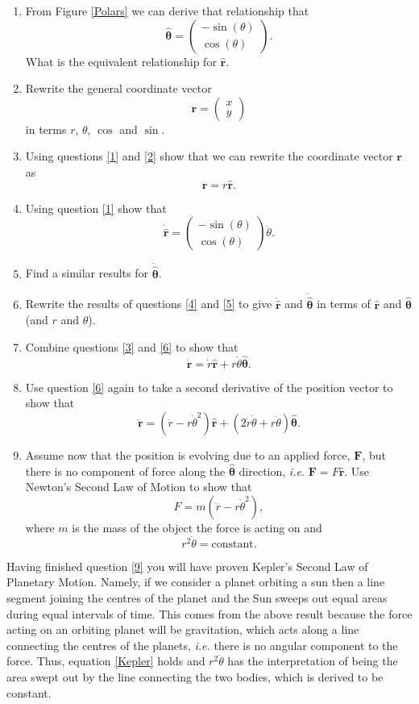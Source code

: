 \documentclass[]{article}
\newcommand{\myvec}[1]{\ensuremath{\begin{pmatrix}#1\end{pmatrix}}}
\newcommand{\bb}{\begin{equation}}
\newcommand{\ee}{\end{equation}}
\newcommand{\fig}[1]{Figure \ref{#1}}
\newcommand{\eqn}[1]{equation \eqref{#1}}
\newcommand{\ie}{\emph{i.e.} }
\renewcommand{\l}{\left(}
\renewcommand{\r}{\right)}
\begin{document}
\begin{enumerate}
\item \label{1} From \fig{Polars} we can derive that relationship that
\bb
\hat{\bm{\theta}}=\myvec{-\sin(\theta)\\ \cos(\theta)}.
\ee
What is the equivalent relationship for $\hat{\bm{r}}$.
\item \label{2} Rewrite the general coordinate vector
\bb
\bm{r}=\myvec{x\\y}
\ee
in terms $r$, $\theta$, $\cos$ and $\sin$.
\item \label{3} Using questions \ref{1} and \ref{2} show that we can rewrite the coordinate vector $\bm{r}$ as
\bb
\bm{r}=r\hat{\bm{r}}.
\ee
\item \label{4} Using question \ref{1} show that
\bb
\dot{\hat{\bm{r}}}=\myvec{-\sin(\theta)\\\cos(\theta)}\dot{\theta}.
\ee
\item \label{5} Find a similar results for $\dot{\hat{\bm{\theta}}}$.
\item \label{6} Rewrite the results of questions \ref{4} and \ref{5} to give $\dot{\hat{\bm{r}}}$ and $\dot{\hat{\bm{\theta}}}$ in terms of $\hat{\bm{r}}$ and $\hat{\bm{\theta}}$ (and $r$ and $\theta$).
\item \label{7} Combine questions \ref{3} and \ref{6} to show that
\bb
\dot{\bm{r}}=\dot{r}\hat{\bm{r}}+r\dot{\theta}\hat{\bm{\theta}}.
\ee
\item \label{8} Use question \ref{6} again to take a second derivative of the position vector to show that
\bb
\ddot{\bm{r}}=\l\ddot{r}-r\dot{\theta}^2\r\hat{\bm{r}}+\l 2\dot{r}\dot{\theta}+r\ddot{\theta}\r\hat{\bm{\theta}}.
\ee
\item \label{9} Assume now that the position is evolving due to an applied force, $\bm{F}$, but there is no component of force along the $\hat{\bm{\theta}}$ direction, \ie $\bm{F}=F\hat{\bm{r}}$. Use Newton's Second Law of Motion to show that
\bb
F=m\l\ddot{r}-r\dot{\theta}^2\r,
\ee
where $m$ is the mass of the object the force is acting on and
\bb
r^2\dot{\theta}=\textrm{constant}.\label{Kepler}
\ee
\end{enumerate}
Having finished question \ref{9} you will have proven Kepler's Second Law of Planetary Motion. Namely, if we consider a planet orbiting a sun then a line segment joining the centres of the planet and the Sun sweeps out equal areas during equal intervals of time. This comes from the above result because the force acting on an orbiting planet will be gravitation, which acts along a line connecting the centres of the planets, \ie there is no angular component to the force. Thus, \eqn{Kepler} holds and $r^2\dot{\theta}$ has the interpretation of being the area swept out by the line connecting the two bodies, which is derived to be constant.
\end{document}
